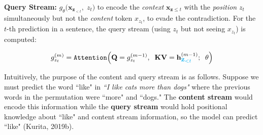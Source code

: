 \textbf{Query Stream: } $g_\theta \Big( \textbf{x}_{\textbf{z}_{< t}}, \; z_t \Big)$ to encode the \emph{context} $\textbf{x}_{\textbf{z} \leq t}$ with the \emph{position} $z_t$ simultaneously but not the \emph{content} token $x_{z_t}$, to evade the contradiction. For the $t$-th prediction in a sentence, the query stream (using $z_t$ but not seeing $x_{z_t}$) is computed: 

\begin{equation}\label{eq:QueryStreamCalc}
    g_{z_t}^{(m)} = \texttt{Attention} \Big( \textbf{Q} = g_{z_t}^{(m-1)}, \;\; \textbf{KV} = \textbf{h}_{ {\color{cyan} \mathlarger{\mathlarger{\mathbf{z}_{< t}}}  } }^{(m-1)}; \;\; \theta  \Big)
\end{equation}


%     
%     


Intuitively, the purpose of the content and query stream is as follows. Suppose we must predict the word ``like" in \textit{``I like cats more than dogs"} where the previous words in the permutation were ``more" and ``dogs." The \textbf{content stream} would encode this information while the \textbf{query stream} would hold positional knowledge about ``like" and content stream information, so the model can predict ``like" (Kurita, 2019b). 




